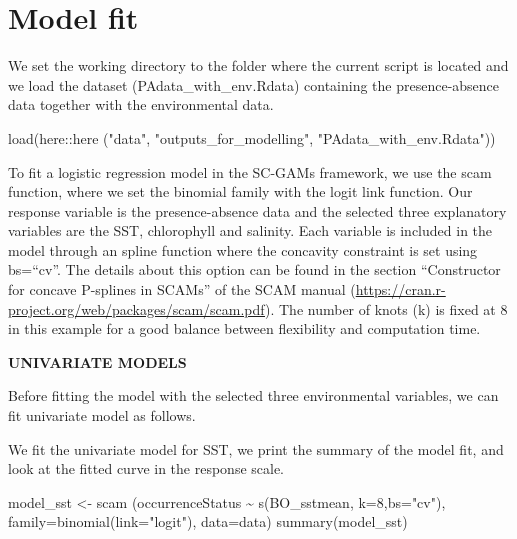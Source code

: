 \documentclass[
]{book}
\newenvironment{Shaded}{\begin{snugshade}}{\end{snugshade}}
\newcommand{\AttributeTok}[1]{\textcolor[rgb]{0.77,0.63,0.00}{#1}}
\newcommand{\DecValTok}[1]{\textcolor[rgb]{0.00,0.00,0.81}{#1}}
\newcommand{\FunctionTok}[1]{\textcolor[rgb]{0.00,0.00,0.00}{#1}}
\newcommand{\NormalTok}[1]{#1}
\newcommand{\OtherTok}[1]{\textcolor[rgb]{0.56,0.35,0.01}{#1}}
\newcommand{\SpecialCharTok}[1]{\textcolor[rgb]{0.00,0.00,0.00}{#1}}
\newcommand{\StringTok}[1]{\textcolor[rgb]{0.31,0.60,0.02}{#1}}
\begin{document}
\hypertarget{model-fit}{%
\section{Model fit}\label{model-fit}}

We set the working directory to the folder where the current script is located and we load the dataset (PAdata\_with\_env.Rdata) containing the presence-absence data together with the environmental data.

\begin{Shaded}
\begin{Highlighting}[]
\FunctionTok{load}\NormalTok{(here}\SpecialCharTok{::}\FunctionTok{here}\NormalTok{ (}\StringTok{"data"}\NormalTok{, }\StringTok{"outputs\_for\_modelling"}\NormalTok{, }\StringTok{"PAdata\_with\_env.Rdata"}\NormalTok{))}
\end{Highlighting}
\end{Shaded}

To fit a logistic regression model in the SC-GAMs framework, we use the scam function, where we set the binomial family with the logit link function. Our response variable is the presence-absence data and the selected three explanatory variables are the SST, chlorophyll and salinity. Each variable is included in the model through an spline function where the concavity constraint is set using bs=``cv''. The details about this option can be found in the section ``Constructor for concave P-splines in SCAMs'' of the SCAM manual (\url{https://cran.r-project.org/web/packages/scam/scam.pdf}). The number of knots (k) is fixed at 8 in this example for a good balance between flexibility and computation time.

\textbf{UNIVARIATE MODELS}

Before fitting the model with the selected three environmental variables, we can fit univariate model as follows.

We fit the univariate model for SST, we print the summary of the model fit, and look at the fitted curve in the response scale.

\begin{Shaded}
\begin{Highlighting}[]
\NormalTok{model\_sst }\OtherTok{\textless{}{-}} \FunctionTok{scam}\NormalTok{ (occurrenceStatus }\SpecialCharTok{\textasciitilde{}}  \FunctionTok{s}\NormalTok{(BO\_sstmean, }\AttributeTok{k=}\DecValTok{8}\NormalTok{,}\AttributeTok{bs=}\StringTok{"cv"}\NormalTok{), }\AttributeTok{family=}\FunctionTok{binomial}\NormalTok{(}\AttributeTok{link=}\StringTok{"logit"}\NormalTok{), }\AttributeTok{data=}\NormalTok{data)}
\FunctionTok{summary}\NormalTok{(model\_sst)}
\end{Highlighting}
\end{Shaded}
\end{document}
